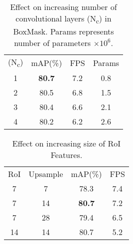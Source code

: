 \documentclass[10pt,twocolumn,letterpaper]{article}
\begin{document}
\begin{minipage}{\linewidth}
\begin{minipage}{0.4\linewidth}
    \vspace{-10pt}
    \begin{table}[H]
      \begin{center}
        {\small{
            \begin{tabular}{c|ccc}
            \toprule
            (N\textsubscript{c}) & mAP(\%) & FPS & Params\\
            \noalign{\smallskip}
            \midrule
            \noalign{\smallskip}
            1 & \textbf{80.7} & 7.2 & 0.8\\
            2 & 80.5 & 6.8& 1.5\\
            3 & 80.4 & 6.6& 2.1\\
            4 & 80.2 & 6.2& 2.6\\
            \bottomrule
            \end{tabular}
            }}
        \end{center}
    \caption{Effect on increasing number of convolutional layers (N\textsubscript{c}) in BoxMask. Params represents number of parameters $\times 10^6$.}
    \label{table:increasing_conv}
    \end{table}
  \end{minipage}
  \hspace{0.05\linewidth}
  \begin{minipage}{0.4\linewidth}
  \vspace{-50pt}
\begin{table}[H]
  \begin{center}
    {\small{
        \begin{tabular}{cc|cc}
            \toprule
            RoI & Upsample & mAP(\%) & FPS\\
            \noalign{\smallskip}
            \midrule
            \noalign{\smallskip}
            7 & 7 & 78.3 & 7.4\\
            7 & 14 & \textbf{80.7} & 7.2\\
            7 & 28 & 79.4 & 6.5\\
            14 & 14 & 80.7 & 5.2 \\
            \bottomrule
        \end{tabular}
        }}
    \end{center}
        \caption{Effect on increasing size of RoI Features.}
\label{table:roi_size}
\end{table}
  \end{minipage}
\end{minipage}
\end{document}
